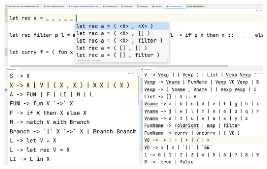 \documentclass[portrait,a0b,final,a4resizeable]{a0poster}
\def\jointspacing{\vspace{0.3in}}
\begin{document}
\begin{poster}
\begin{multicols}{2}
      \jointspacing


      \begin{minipage}[c]{0.90\columnwidth}
          \href{https://github.com/breandan/tidyparse}{\includegraphics[width=\textwidth]{../figures/tidyparse.png}}
      \end{minipage}

      \jointspacing

    \end{multicols}


\end{poster}
\end{document}
